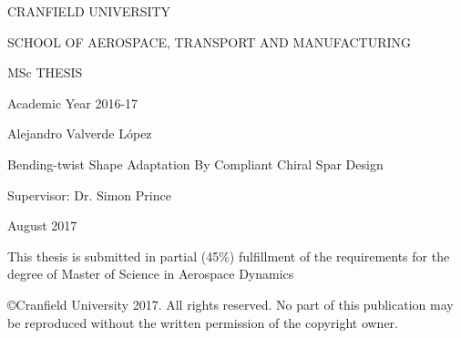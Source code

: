 



\thispagestyle{empty}

\large \begin{center}


CRANFIELD UNIVERSITY

\vspace{15mm}

SCHOOL OF AEROSPACE, TRANSPORT AND MANUFACTURING

\vspace{12mm}

MSc THESIS

\vspace{12mm}

Academic Year 2016-17

\vspace{12mm} \Large

Alejandro Valverde L\'opez

\vspace{12mm}

Bending-twist Shape Adaptation By Compliant Chiral Spar Design

\vspace{12mm} \large

Supervisor: \hspace{30mm} Dr. Simon Prince

\vspace{10mm}

August 2017

\vspace{5mm} \normalsize


This thesis is submitted in partial (45\%) fulfillment of the
requirements for the degree of Master of Science in Aerospace Dynamics

\vspace{5mm}

\copyright Cranfield University 2017. All rights reserved. No
part of this publication may be reproduced without the written
permission of the copyright owner.

\end{center}

\pagebreak


\ClearDoublePageOrNot{\controlClearPage} %



